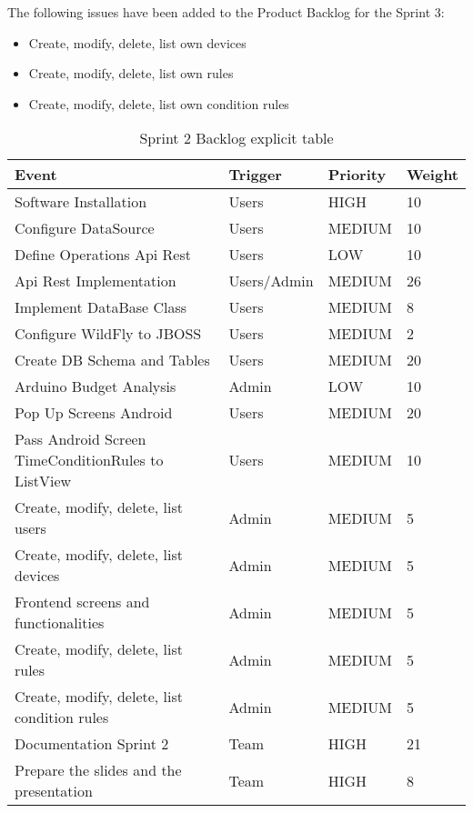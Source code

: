\documentclass[11pt,a4paper]{article}
\begin{document}
The following issues have been added to the Product Backlog for the Sprint 3: 
\begin{itemize}
    \item Create, modify, delete, list own devices
    \item Create, modify, delete, list own rules
    \item Create, modify, delete, list own condition rules
\end{itemize}
\begin{table}[htbp]
\begin{tabular}{|l|l|l|l|} 
\hline
Event                                                & Trigger     & Priority & Weight \\ \hline \hline
Software Installation                                & Users       & HIGH     & 10     \\ \hline
Configure DataSource                                 & Users       & MEDIUM   & 10     \\ \hline
Define Operations Api Rest                           & Users       & LOW      & 10     \\ \hline
Api Rest Implementation                              & Users/Admin & MEDIUM   & 26     \\ \hline
Implement DataBase Class                             & Users       & MEDIUM   & 8      \\ \hline
Configure WildFly to JBOSS                           & Users       & MEDIUM   & 2      \\ \hline
Create DB Schema and Tables                          & Users       & MEDIUM   & 20     \\ \hline
Arduino Budget Analysis                              & Admin       & LOW      & 10     \\ \hline
Pop Up Screens Android                               & Users       & MEDIUM   & 20     \\ \hline
Pass Android Screen TimeConditionRules to ListView   & Users       & MEDIUM   & 10     \\ \hline
Create, modify, delete, list users                   & Admin       & MEDIUM   & 5      \\ \hline
Create, modify, delete, list devices                 & Admin       & MEDIUM   & 5      \\ \hline
Frontend screens and functionalities                 & Admin       & MEDIUM   & 5      \\ \hline
Create, modify, delete, list rules                   & Admin       & MEDIUM   & 5      \\ \hline
Create, modify, delete, list condition rules         & Admin       & MEDIUM   & 5      \\ \hline
Documentation Sprint 2                               & Team        & HIGH     & 21     \\ \hline
Prepare the slides and the presentation              & Team        & HIGH     & 8      \\ \hline
\end{tabular}
\caption{Sprint 2 Backlog explicit table}
\end{table}
\end{document}
